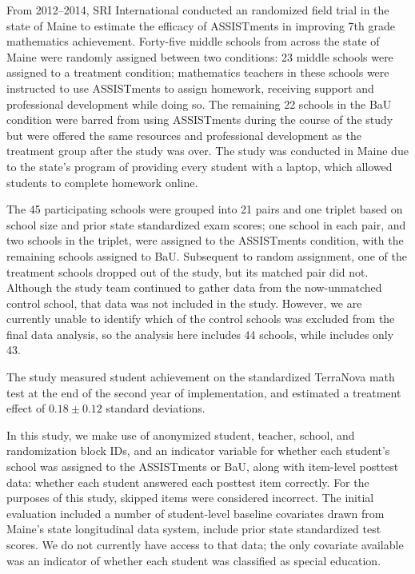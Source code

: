 \documentclass{edm_article}
\begin{document}
From 2012--2014, SRI International conducted an randomized field trial
in the state of Maine to estimate the efficacy 
of ASSISTments in improving 7th grade mathematics achievement.
Forty-five middle schools from across the state of Maine were randomly
assigned between two conditions: 
23 middle schools were assigned to a treatment condition; mathematics
teachers in these schools were instructed to use ASSISTments to assign homework, receiving support and professional
development while doing so. The remaining 22 schools in the BaU
condition were barred from using ASSISTments
during the course of the study but were offered the
same resources and professional development as the treatment group
after the study was over.
The study was conducted in Maine due to the state's program of
providing every student with a laptop, which allowed students to
complete homework online. 

The 45 participating schools were grouped into 21 pairs and one
triplet based on school size and prior state standardized exam scores;
one school in each pair, and two schools in the triplet, were assigned
to the ASSISTments condition, with the remaining schools assigned to
BaU. 
Subsequent to random assignment, one of the treatment schools dropped
out of the study, but its matched pair did not. Although the study
team continued to gather data from the now-unmatched control school,
that data was not included in the study. However, we are currently
unable to identify which of the control schools was excluded from the
final data analysis, so the analysis here includes 44 schools, while
\cite{roschelle2016online} includes only 43. 

The study measured student achievement on the standardized TerraNova
math test at the end of the second year of implementation, and
estimated a treatment effect of $0.18\pm0.12$ standard deviations.

In this study, we make use of 
anonymized student, teacher, school, and randomization block IDs, and
an indicator variable for whether each student's school was assigned
to the ASSISTments or BaU, along with item-level posttest data: whether each
student answered each posttest item correctly.
For the purposes of this study, skipped items were considered
incorrect.
The initial evaluation included a number of student-level baseline
covariates drawn from Maine's state longitudinal data system, include
prior state standardized test scores. We do not currently 
have access to that data; the only covariate available was an
indicator of whether each student was classified as special
education. 
\end{document}
